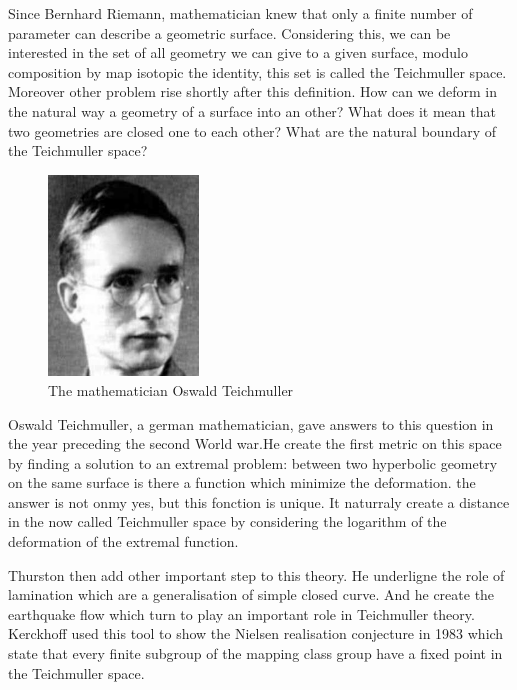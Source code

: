 
\hspace{20 px} Since Bernhard Riemann, mathematician knew that only a finite number of parameter can describe a geometric surface. Considering this, we can be interested in the set of all geometry we can give to a given surface, modulo composition by map isotopic the identity, this set is called the Teichmuller space. Moreover other problem rise shortly after this definition. How can we deform in the natural way a geometry of a surface into an other? What does it mean that two geometries are closed one to each other? What are the natural boundary of the Teichmuller space?

\begin{figure}
  \centering
  \includegraphics[width=4cm]{Image/Teichmuller.jpeg}
  \caption{The mathematician Oswald Teichmuller}
\end{figure}

\vspace{10 px}

Oswald Teichmuller, a german mathematician, gave answers to this question in the year preceding the second World war.He create the first metric on this space by finding a solution to an extremal problem: between two hyperbolic geometry on the same surface is there a function which minimize the deformation. the answer is not onmy yes, but this fonction is unique. It naturraly create a distance in the now called Teichmuller space by considering the logarithm of the deformation of the extremal function.


\vspace{10 px}

Thurston then add other important step to this theory. He underligne the role of lamination which are a generalisation of simple closed curve. And he create the earthquake flow which turn to play an important role in Teichmuller theory.
Kerckhoff used this tool to show the Nielsen realisation conjecture in 1983 \cite{NielsenRealizationPro} which state that every finite subgroup of the mapping class group have a fixed point in the Teichmuller space.

